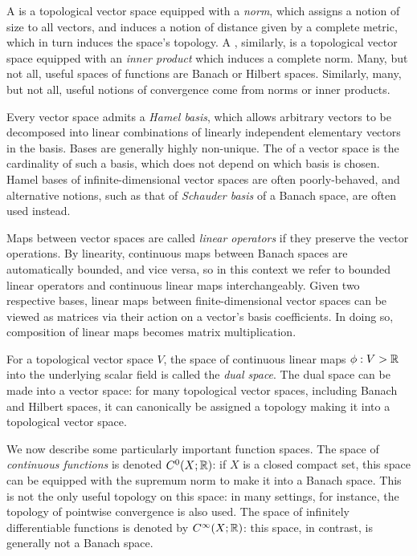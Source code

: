 \documentclass[11pt]{book}
\begin{document}
A  is a topological vector space equipped with a \emph{norm}, which assigns a notion of size to all vectors, and induces a notion of distance given by a complete metric, which in turn induces the space's topology.
A , similarly, is a topological vector space equipped with an \emph{inner product} which induces a complete norm.
Many, but not all, useful spaces of functions are Banach or Hilbert spaces.
Similarly, many, but not all, useful notions of convergence come from norms or inner products.

Every vector space admits a \emph{Hamel basis}, which allows arbitrary vectors to be decomposed into linear combinations of linearly independent elementary vectors in the basis.
Bases are generally highly non-unique.
The  of a vector space is the cardinality of such a basis, which does not depend on which basis is chosen.
Hamel bases of infinite-dimensional vector spaces are often poorly-behaved, and alternative notions, such as that of \emph{Schauder basis} of a Banach space, are often used instead.

Maps between vector spaces are called \emph{linear operators} if they preserve the vector operations.
By linearity, continuous maps between Banach spaces are automatically bounded, and vice versa, so in this context we refer to bounded linear operators and continuous linear maps interchangeably.
Given two respective bases, linear maps between finite-dimensional vector spaces can be viewed as matrices via their action on a vector's basis coefficients.
In doing so, composition of linear maps becomes matrix multiplication.

For a topological vector space $V$, the space of continuous linear maps $\phi : V \-> \mathbb{R}$ into the underlying scalar field is called the \emph{dual space}.
The dual space can be made into a vector space: for many topological vector spaces, including Banach and Hilbert spaces, it can canonically be assigned a topology making it into a topological vector space.

We now describe some particularly important function spaces.
The space of \emph{continuous functions} is denoted $C^0(X;\mathbb{R})$: if $X$ is a closed compact set, this space can be equipped with the supremum norm to make it into a Banach space.
This is not the only useful topology on this space: in many settings, for instance, the topology of pointwise convergence is also used.
The space of infinitely differentiable functions is denoted by $C^\infty(X;\mathbb{R})$: this space, in contrast, is generally not a Banach space.
\end{document}
